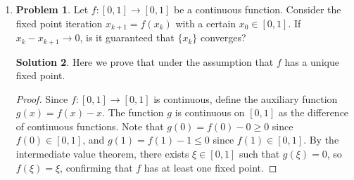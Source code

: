 \documentclass[12pt]{article}
\theoremstyle{definition}
\newtheorem*{solution}{\normalfont\textbf{Solution}}
\newtheorem*{Problem}{\noindent\textbf{Problem}}
\begin{document}
\begin{enumerate}[leftmargin=*]
\begin{solution}
\begin{proof}
                Now consider the sequence \( \{x_{k_j+1}\} \). Since \( x_{k_j+1} = T(x_{k_j}) \) and \( T \) is continuous, we have
                \[
                \lim_{j \to \infty} x_{k_j+1} = T( \lim_{j \to \infty} x_{k_j} ) = T(z).
                \]
                The limit of the corresponding distance sequence \( \{d_{k_j+1}\} \) must also be \( M \). Thus,
                \[
                \|T(z) - x^*\| = \lim_{j \to \infty} \|x_{k_j+1} - x^*\| = \lim_{j \to \infty} d_{k_j+1} = M.
                \]
                So we have established both \( \|z - x^*\| = M \) and \( \|T(z) - T(x^*)\| = \|T(z) - x^*\| = M \).
                However, since \( z \neq x^* \), the defining property of the operator \( T \) requires that
                \[
                \|T(z) - T(x^*)\| < \|z - x^*\|.
                \]
                Substituting our findings, this implies \( M < M \), which is a clear contradiction.
                Therefore, our assumption that \( M > 0 \) must be false. We conclude that \( M = 0 \).

                Since the limit of the sequence \( \{d_k\} = \{\|x_k - x^*\|\} \) is 0, this implies that the sequence \( \{x_k\} \) converges to \( x^* \).
            \end{proof}
    \end{solution}
    \item \begin{Problem}
            Let \( f : [0, 1] \to [0, 1] \) be a continuous function. Consider the fixed point iteration \( x_{k + 1} = f(x_k) \) with a certain \( x_0 \in [0, 1] \). If \( x_k - x_{k + 1} \to 0 \), is it guaranteed that \( \{ x_k \} \) converges?
        \end{Problem}
        \begin{solution}
        Here we prove that under the assumption that \(f\) has a unique fixed point.
        \begin{proof}
            Since \( f: [0,1] \to [0,1] \) is continuous, define the auxiliary function \( g(x) = f(x) - x \). The function \( g \) is continuous on \([0,1]\) as the difference of continuous functions. Note that \( g(0) = f(0) - 0 \geq 0 \) since \( f(0) \in [0,1] \), and \( g(1) = f(1) - 1 \leq 0 \) since \( f(1) \in [0,1] \). By the intermediate value theorem, there exists \( \xi \in [0,1] \) such that \( g(\xi) = 0 \), so \( f(\xi) = \xi \), confirming that \( f \) has at least one fixed point.


\end{proof}
\end{solution}
\end{enumerate}
\end{document}
